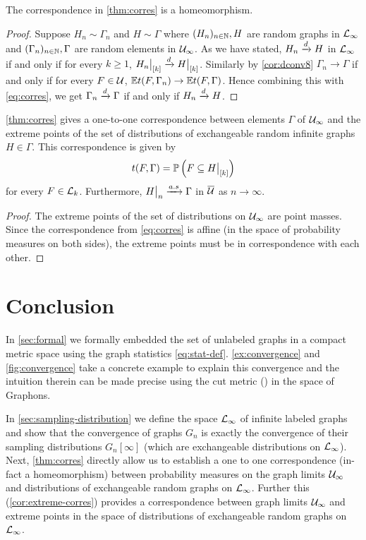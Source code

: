 \documentclass{article}
\begin{document}
\begin{cor}
  The correspondence in \autoref{thm:corres} is a homeomorphism.
\end{cor}
\begin{proof}
  Suppose $H_n \sim \Gamma_n$ and $H \sim \Gamma$ where $(H_n)_{n \in \N}, H$ are random graphs in $\Lg_{\infty}$ and $(\Gamma_n)_{n \in \N}, \Gamma$ are random elements in $\Ug_{\infty}$.
  As we have stated, $H_n \xrightarrow{d} H$ in $\Lg_{\infty}$ if and only if for every $k \geq 1$, $\restr{H_n}{[k]} \dconv \restr{H}{[k]}$.
  Similarly by \autoref{cor:dconv8} $\Gamma_n \to \Gamma$ if and only if for every $F \in \Ug$, $\Ex t(F, \Gamma_n) \to \Ex t(F, \Gamma)$. Hence combining this with \eqref{eq:corres}, we get $\Gamma_n \xrightarrow{d} \Gamma$ if and only if $H_n \xrightarrow{d} H$.
\end{proof}
\begin{cor}
  \label{cor:extreme-corres}
  \autoref{thm:corres} gives a one-to-one correspondence between elements $\Gamma$ of $\Ug_{\infty}$ and the extreme points of the set of distributions of exchangeable random infinite graphs $H \in \Gamma$. This correspondence is given by
  \begin{equation}
    t(F, \Gamma) = \Pb(F \subseteq \restr{H}{[k]})
    \label{eq:extreme-corres}
  \end{equation}
  for every $F \in \Lg_{k}$. Furthermore, $\restr{H}{n} \xrightarrow{a.s} \Gamma$ in $\Ug*$ as $n \to \infty$.
\end{cor}
\begin{proof}
  The extreme points of the set of distributions on $\Ug_{\infty}$ are point masses. Since the correspondence from \eqref{eq:corres} is affine (in the space of probability measures on both sides), the extreme points must be in correspondence with each other. 
\end{proof}

\section{Conclusion}

In \autoref{sec:formal} we formally embedded the set of unlabeled graphs in a compact metric space using the graph statistics \eqref{eq:stat-def}. \autoref{ex:convergence} and \autoref{fig:convergence} take a concrete example to explain this convergence and the intuition therein can be made precise using the cut metric (\cite[p.~127]{lovasz-book}) in the space of Graphons.

In \autoref{sec:sampling-distribution} we define the space $\Lg_{\infty}$ of infinite labeled graphs and show that the convergence of graphs $G_n$ is exactly the convergence of their sampling distributions $G_n[\infty]$ (which are exchangeable distributions on $\Lg_{\infty}$). Next, \autoref{thm:corres} directly allow us to establish a one to one correspondence (in-fact a homeomorphism) between probability measures on the graph limits $\Ug_{\infty}$ and distributions of exchangeable random graphs on $\Lg_{\infty}$. Further this (\autoref{cor:extreme-corres}) provides a correspondence between graph limits $\Ug_{\infty}$ and extreme points in the space of distributions of exchangeable random graphs on $\Lg_{\infty}$.
\end{document}
